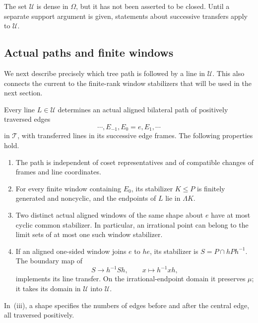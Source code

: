 The set $\mathcal U$ is dense in $\Omega$, but it has not been
asserted to be closed.  Until a separate support argument is given,
statements about successive transfers apply to $\mathcal U$.

\subsection{Actual paths and finite windows}

We next describe precisely which tree path is followed by a line in
$\mathcal U$.  This also connects the current to the finite-rank
window stabilizers that will be used in the next section.

\begin{proposition}\label{stat:windows}
Every line $L\in\mathcal U$ determines an actual aligned bilateral
path of positively traversed edges
\[
                     \cdots,E_{-1},E_0=e,E_1,\cdots
\]
in $\mathcal T$, with transferred lines in its successive edge frames.
The following properties hold.
\begin{enumerate}[label=\textup{(\roman*)}]
\item The path is independent of coset representatives and of
compatible changes of frames and line coordinates.
\item For every finite window containing $E_0$, its stabilizer
$K\le P$ is finitely generated and noncyclic, and the endpoints of
$L$ lie in $\Lambda K$.
\item Two distinct actual aligned windows of the same shape about
$e$ have at most cyclic common stabilizer.  In particular, an
irrational point can belong to the limit sets of at most one such
window stabilizer.
\item If an aligned one-sided window joins $e$ to $he$, its
stabilizer is $S=P\cap hPh^{-1}$.  The boundary map of
\[
                  S\longrightarrow h^{-1}Sh,
                         \qquad x\longmapsto h^{-1}xh,
\]
implements its line transfer.  On the irrational-endpoint domain it
preserves $\mu$; it takes its domain in $\mathcal U$ into
$\mathcal U$.
\end{enumerate}
In~\textup{(iii)}, a shape specifies the numbers of edges before and
after the central edge, all traversed positively.
\end{proposition}
